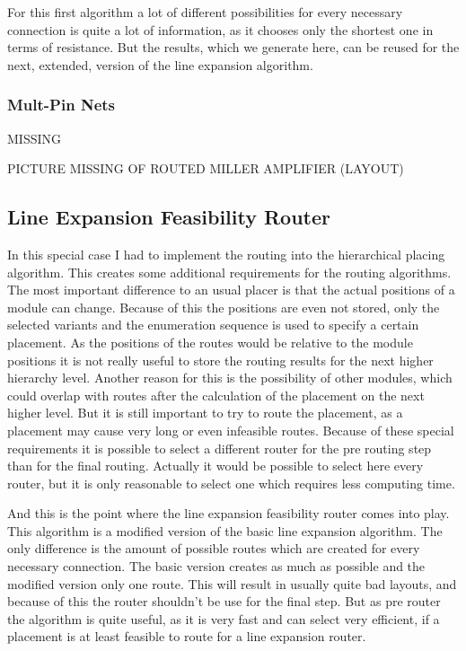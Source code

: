 For this first algorithm a lot of different possibilities for every necessary connection is quite a lot of information, as it chooses only the shortest one in terms of resistance. But the results, which we generate here, can be reused for the next, extended, version of the line expansion algorithm.

\subsubsection{Mult-Pin Nets}
MISSING

PICTURE MISSING OF ROUTED MILLER AMPLIFIER (LAYOUT)

\subsection{Line Expansion Feasibility Router}
In this special case I had to implement the routing into the hierarchical placing algorithm. This creates some additional requirements for the routing algorithms. The most important difference to an usual placer is that the actual positions of a module can change. Because of this the positions are even not stored, only the selected variants and the enumeration sequence is used to specify a certain placement. As the positions of the routes would be relative to the module positions it is not really useful to store the routing results for the next higher hierarchy level. Another reason for this is the possibility of other modules, which could overlap with routes after the calculation of the placement on the next higher level. But it is still important to try to route the placement, as a placement may cause very long or even infeasible routes. Because of these special requirements it is possible to select a different router for the pre routing step than for the final routing. Actually it would be possible to select here every router, but it is only reasonable to select one which requires less computing time.

And this is the point where the line expansion feasibility router comes into play. This algorithm is a modified version of the basic line expansion algorithm. The only difference  is the amount of possible routes which are created for every necessary connection. The basic version creates as much as possible and the modified version only one route. This will result in usually quite bad layouts, and because of this the router shouldn't be use for the final step. But as pre router the algorithm is quite useful, as it is very fast and can select very efficient, if a placement is at least feasible to route for a line expansion router.


